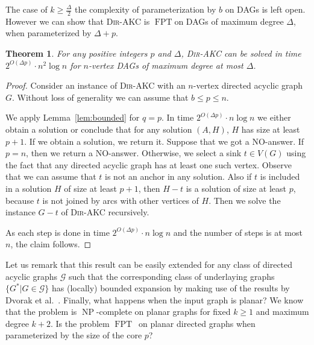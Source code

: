 \documentclass[11pt,a4paper]{article}
\newtheorem{theorem}{Theorem}
\DeclareMathOperator{\operatorClassNP}{NP}
\newcommand{\classNP}{\ensuremath{\operatorClassNP}}
\DeclareMathOperator{\operatorClassFPT}{FPT}
\newcommand{\classFPT}{\ensuremath{\operatorClassFPT}}
\newcommand{\DAKC}{\textsc{Dir-AKC}\xspace}
\begin{document}
The case of $k\geq \frac{\Delta}{2}$ the complexity of parameterization by $b$ on DAGs is left open. However we can show that
\DAKC is \classFPT on DAGs of maximum degree $\Delta$, when parameterized by $\Delta+p$.

\begin{theorem}\label{thm:dags}
For any positive integers $p$ and $\Delta$, \DAKC can be solved in time $2^{O(\Delta p)}\cdot n^2\log n$ for
$n$-vertex DAGs of maximum degree at most $\Delta$.
\end{theorem}

\begin{proof}
Consider an instance of \DAKC with an $n$-vertex directed acyclic graph $G$. Without loss of generality we can assume that
$b\leq p\leq n$.

We apply Lemma~\ref{lem:bounded} for $q=p$. In time $2^{O(\Delta p)}\cdot n\log n$ we either obtain a solution or conclude
that for any solution $(A,H)$, $H$ has size at least $p+1$. If we obtain a solution, we return it. Suppose that we got a
NO-answer. If $p=n$, then we return a NO-answer. Otherwise,  we select a sink $t\in V(G)$ using the fact that any directed
acyclic graph has at least one such vertex. Observe that we can assume that $t$ is not an anchor in any solution. Also if $t$
is included in a solution $H$ of size at least $p+1$, then $H-t$ is a solution of size at least $p$, because $t$ is not joined
by arcs with other vertices of $H$. Then we solve the instance $G-t$ of \DAKC recursively.

As each step is done in time $2^{O(\Delta p)}\cdot n\log n$ and the number of steps is at most $n$, the claim follows.
\end{proof}

Let us remark that this result can be easily extended for any class of directed acyclic graphs $\mathcal{G}$ such that the
corresponding class of underlaying graphs $\{G^*|G\in \mathcal{G}\}$ has (locally) bounded expansion by making use of  the
results by Dvorak et al.~\cite{DvorakKT10}.
Finally, what happens when the input graph is planar? We know that the problem is \classNP-complete on planar graphs for fixed
$k\geq 1$ and maximum degree $k+2$. Is the problem \classFPT\ on planar directed graphs when parameterized by the size of the
core $p$?
\end{document}
